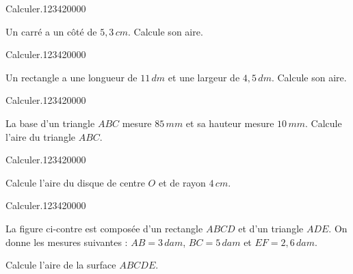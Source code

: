 \begin{pageAD}


 
\begin{ExoCad}{Calculer.}{1234}{2}{0}{0}{0}{0}


 
 Un carré a un côté de $5,3\,cm$. Calcule son aire.
 
\end{ExoCad} 

\begin{ExoCad}{Calculer.}{1234}{2}{0}{0}{0}{0}


 Un rectangle a une longueur de $11\,dm$ et une largeur de $4,5\,dm$. Calcule son aire.
 
\end{ExoCad} 

\begin{ExoCad}{Calculer.}{1234}{2}{0}{0}{0}{0}
 
La base d'un triangle $ABC$ mesure $85\,mm $ et sa hauteur mesure $10\,mm$. Calcule l'aire du triangle $ABC$.


\end{ExoCad} 

\begin{ExoCad}{Calculer.}{1234}{2}{0}{0}{0}{0}
 
 Calcule l'aire du disque de centre $O$ et de rayon $4\,cm$. 
 \end{ExoCad} 

\vspace{0.4cm}
 
 

\begin{ExoCad}{Calculer.}{1234}{2}{0}{0}{0}{0}
 

\begin{minipage}{.68\linewidth}
La figure ci-contre est composée d'un rectangle $ABCD$ et d'un triangle $ADE$. On donne les mesures suivantes :
$AB = 3\,dam$, $BC = 5\,dam$ et $EF = 2,6\,dam$.

Calcule l'aire de la surface $ABCDE$.

\end{minipage}
\hfill
\begin{minipage}{.28\linewidth}



\end{minipage}
\end{ExoCad}
\end{pageAD}
